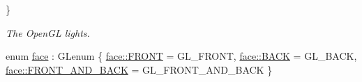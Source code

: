 \begin{DoxyCompactItemize}
 \}\begin{DoxyCompactList}\small\item\em The Open\+GL lights. \end{DoxyCompactList}
\item 
enum \hyperlink{namespaceglpp_aebf73491431939f1e6ec6ec2d4404244}{face} \+: G\+Lenum \{ \hyperlink{namespaceglpp_aebf73491431939f1e6ec6ec2d4404244abb2fe5c916efb43aab8cbb68f997d2ee}{face\+::\+F\+R\+O\+NT} = G\+L\+\_\+\+F\+R\+O\+NT, 
\hyperlink{namespaceglpp_aebf73491431939f1e6ec6ec2d4404244a1dd26f1f1790f0b56d5752fb0fbecef0}{face\+::\+B\+A\+CK} = G\+L\+\_\+\+B\+A\+CK, 
\hyperlink{namespaceglpp_aebf73491431939f1e6ec6ec2d4404244aca0e438cddda63061a0149241dc23ad1}{face\+::\+F\+R\+O\+N\+T\+\_\+\+A\+N\+D\+\_\+\+B\+A\+CK} = G\+L\+\_\+\+F\+R\+O\+N\+T\+\_\+\+A\+N\+D\+\_\+\+B\+A\+CK
 \}
\end{DoxyCompactItemize}
